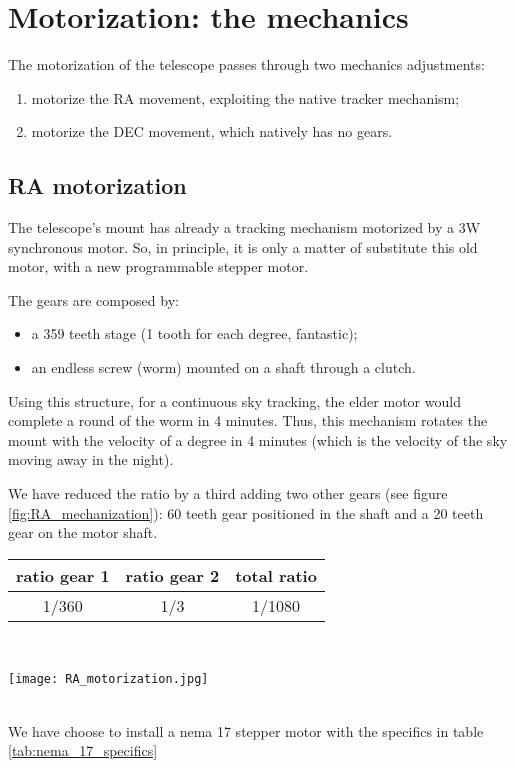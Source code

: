 \section{Motorization: the mechanics}
The motorization of the telescope passes through two mechanics adjustments:
\begin{enumerate}
    \item motorize the RA movement, exploiting the native tracker mechanism;
    \item motorize the DEC movement, which natively has no gears.
\end{enumerate}

\subsection{RA motorization}
The telescope's mount has already a tracking mechanism motorized by a 3W synchronous motor.
So, in principle, it is only a matter of substitute this old motor, with a new programmable stepper motor.

The gears are composed by:
\begin{itemize}
    \item a 359 teeth stage (1 tooth for each degree, fantastic);
    \item an endless screw (worm) mounted on a shaft through a clutch.
\end{itemize}
Using this structure, for a continuous sky tracking, the elder motor would complete a round of the worm in 4 minutes.
Thus, this mechanism rotates the mount with the velocity of a degree in 4 minutes (which is the velocity of the sky moving away in the night).

We have reduced the ratio by a third adding two other gears (see figure \ref{fig:RA_mechanization}): 60 teeth gear positioned in the shaft and a 20 teeth gear on the motor shaft.
\\
\begin{minipage}{.4\textwidth}
    \begin{tabular}{cc|c}
        ratio gear 1 & ratio gear 2 & total ratio \\
        \hline
        1/360 & 1/3 & 1/1080 \\
        \hline
    \end{tabular}
    \label{tab:RA_mechanization}
\end{minipage}
\\
\begin{minipage}{.4\textwidth}
    \centering
    \texttt{[image: RA\_motorization.jpg]}  
    \label{fig:RA_mechanization}         
\end{minipage}
\\
We have choose to install a nema 17 stepper motor with the specifics in table \ref{tab:nema_17_specifics}

